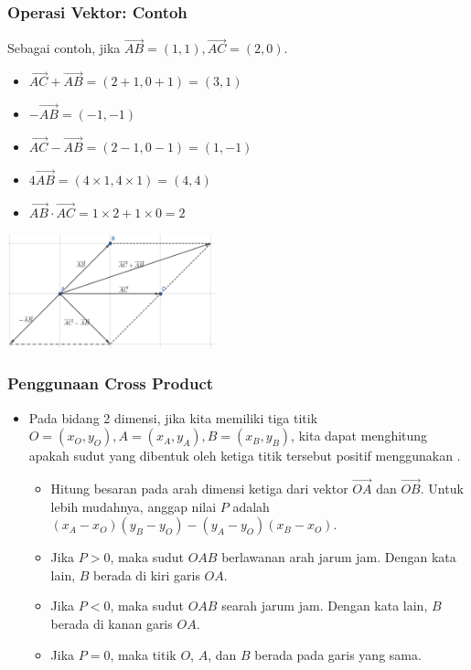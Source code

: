 \begin{frame}
\frametitle{Operasi Vektor: Contoh}
Sebagai contoh, jika $\overrightarrow{AB} = (1, 1), \overrightarrow{AC} = (2, 0)$.
\begin{itemize}
  \item $\overrightarrow{AC} + \overrightarrow{AB} = (2 + 1, 0 + 1) = (3, 1)$
  \item $-\overrightarrow{AB} = (-1, -1)$
  \item $\overrightarrow{AC} - \overrightarrow{AB} = (2 - 1, 0 - 1) = (1, -1)$
  \item $4\overrightarrow{AB} = (4 \times 1, 4 \times 1) = (4, 4)$
  \item $\overrightarrow{AB} \cdot \overrightarrow{AC} = 1 \times 2 + 1 \times 0 = 2$
\end{itemize}
\begin{center}
  \includegraphics[width=6cm]{asset/vector-operations.png}
\end{center}
\end{frame}

\begin{frame}
\frametitle{Penggunaan Cross Product}
\begin{itemize}
  \item Pada bidang 2 dimensi, jika kita memiliki tiga titik $O = (x_O, y_O), A = (x_A, y_A), B = (x_B, y_B)$, kita dapat menghitung apakah sudut yang dibentuk oleh ketiga titik tersebut positif menggunakan \fcrossProduct.
  \begin{itemize}
    \item Hitung besaran pada arah dimensi ketiga dari vektor $\overrightarrow{OA}$ dan $\overrightarrow{OB}$. Untuk lebih mudahnya, anggap nilai $P$ adalah $(x_A - x_O)(y_B - y_O) - (y_A - y_O)(x_B - x_O)$.
    \item Jika $P > 0$, maka sudut $OAB$ berlawanan arah jarum jam. Dengan kata lain, $B$ berada di kiri garis $OA$.
    \item Jika $P < 0$, maka sudut $OAB$ searah jarum jam. Dengan kata lain, $B$ berada di kanan garis $OA$.
    \item Jika $P = 0$, maka titik $O$, $A$, dan $B$ berada pada garis yang sama. 
  \end{itemize}
\end{itemize}
\end{frame}

